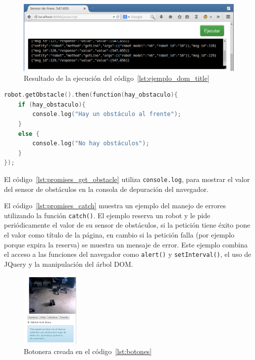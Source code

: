 \begin{figure}
    \centering
    \includegraphics[width=1\textwidth]{figures/ejemplo_web_sensor}
    \caption{Resultado de la ejecución del código~\ref{lst:ejemplo_dom_title}}
    \label{fig:ejemplo_web_sensor}
\end{figure}
\newpage
\begin{lstlisting}[language=C,
caption={Implementación de \texttt{getObstacle()} con ``promesas''},
label=lst:promises_get_obstacle]
robot.getObstacle().then(function(hay_obstaculo){
    if (hay_obstaculo){
        console.log("Hay un obstáculo al frente");
    }
    else {
        console.log("No hay obstáculos");
    }
});
\end{lstlisting}

El código~\ref{lst:promises_get_obstacle} utiliza \texttt{console.log},
para mostrar el valor del sensor de obstáculos en la consola de depuración
del navegador.






El código~\ref{lst:promises_catch} muestra un ejemplo del manejo de errores
utilizando la función \texttt{catch()}. El ejemplo reserva un robot y
le pide periódicamente el valor de su sensor de obstáculos, si la petición tiene
éxito pone el valor como título de la página, en cambio si la petición falla
(por ejemplo porque expira la reserva) se muestra un mensaje de error.
Este ejemplo combina el acceso
a las funciones del navegador como \texttt{alert()} y \texttt{setInterval()},
el uso de JQuery y la manipulación del árbol DOM.

\begin{figure}
        \centering
        \includegraphics[width=0.25\textwidth]{figures/botones}
        \caption{Botonera creada en el código~\ref{lst:botones}}
        \label{fig:botones}
\end{figure}

